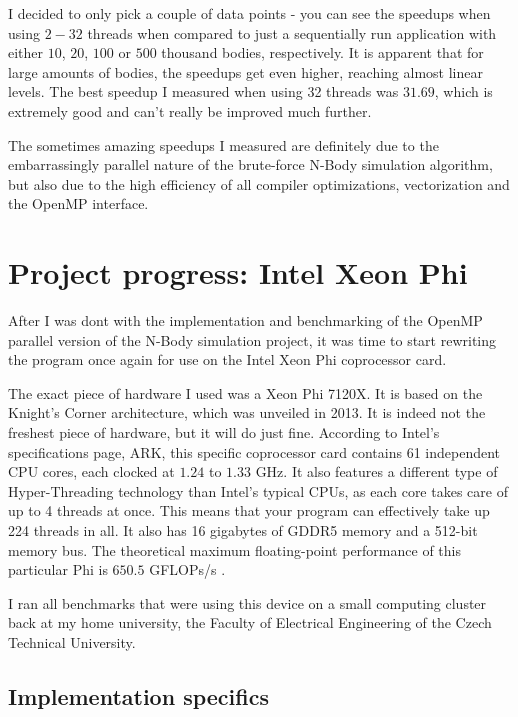 \documentclass[journal]{IEEEtran}
\begin{document}
			I decided to only pick a couple of data points - you can see the speedups when using $2-32$ threads when compared to just a sequentially run application with either $10$, $20$, $100$ or $500$ thousand bodies, respectively. It is apparent that for large amounts of bodies, the speedups get even higher, reaching almost linear levels. The best speedup I measured when using 32 threads was $31.69$, which is extremely good and can't really be improved much further.
			
			The sometimes amazing speedups I measured are definitely due to the embarrassingly parallel nature of the brute-force N-Body simulation algorithm, but also due to the high efficiency of all compiler optimizations, vectorization and the OpenMP interface.
			
	\section{Project progress: Intel Xeon Phi}
	\label{phisection}
		
		After I was dont with the implementation and benchmarking of the OpenMP parallel version of the N-Body simulation project, it was time to start rewriting the program once again for use on the Intel Xeon Phi coprocessor card.
		
		The exact piece of hardware I used was a Xeon Phi 7120X. It is based on the Knight's Corner architecture, which was unveiled in 2013. It is indeed not the freshest piece of hardware, but it will do just fine.
		According to Intel's specifications page, ARK\cite{ark}, this specific coprocessor card contains 61 independent CPU cores, each clocked at $1.24$ to $1.33$ GHz. It also features a different type of Hyper-Threading technology than Intel's typical CPUs, as each core takes care of up to 4 threads at once. This means that your program can effectively take up 224 threads in all. It also has 16 gigabytes of GDDR5 memory and a 512-bit memory bus. The theoretical maximum floating-point performance of this particular Phi is $650.5$ GFLOPs/s \cite{tpu}.
		
		I ran all benchmarks that were using this device on a small computing cluster back at my home university, the Faculty of Electrical Engineering of the Czech Technical University.
		
		\subsection*{Implementation specifics}
		
\end{document}

